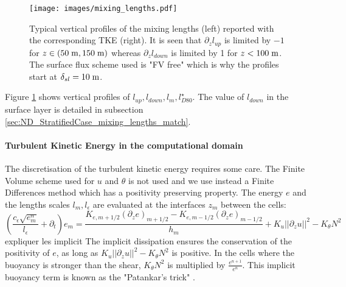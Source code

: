 \begin{figure}
	\centering
	\texttt{[image: images/mixing\_lengths.pdf]}
	\caption{Typical vertical profiles of the mixing lengths
	(left) reported with the corresponding TKE (right).
	It is seen that $\partial_z l_{up}$ is limited by $-1$
	for $z\in (50 \; {\rm m}, 150\; {\rm m})$ whereas
	$\partial_z l_{down}$ is limited by 1 for $z<100 \;{\rm m}$.
	The surface flux scheme used is "FV free" which is why the
	profiles start at $\delta_{sl} = 10\;{\rm m}$.}
	\label{fig:ND_StratifiedCase_mixing_lengths}
\end{figure}
Figure \ref{fig:ND_StratifiedCase_mixing_lengths} shows vertical
profiles of $l_{up}, l_{down}, l_m, l_{D80}^\star$. The value of
$l_{down}$ in the surface layer is detailed in
subsection \ref{sec:ND_StratifiedCase_mixing_lengths_match}.
%
\paragraph{Turbulent Kinetic Energy in the computational domain}
The discretisation of the turbulent kinetic energy
requires some care. The Finite Volume scheme used for
$u$ and $\theta$ is not used and we use instead a Finite Differences
method which has a positivity preserving property.
The energy $e$ and the lengths scales
$l_m, l_\epsilon$ are evaluated at the interfaces
$z_m$ between the cells:
\begin{equation}
\label{eq:ND_StratifiedCase_SemiDiscreteTKE}
    \left(
    \frac{c_\epsilon \sqrt{e^n_m}}{l_\epsilon}
    + \partial_t
    \right) e_m
    =\frac{K_{e,m+1/2} (\partial_z e)_{m+1/2} -
    K_{e,m-1/2} (\partial_z e)_{m-1/2}}{h_{m}}
    + K_u ||\partial_z u||^2
    - K_\theta N^2
\end{equation}
{\color{red} expliquer les implicit}
The implicit dissipation ensures the conservation
of the positivity of $e$, as long as
$K_u ||\partial_z u||^2 - K_\theta N^2$ is positive.
In the cells where the buoyancy is stronger than the shear,
$K_\theta N^2$ is multiplied by
$\frac{e^{n+1}}{e^n}$. This implicit buoyancy term is known
as the "Patankar's trick" \citep{lemarie_simplified_2021}.
